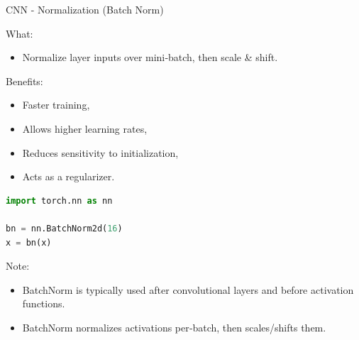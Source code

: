 \begin{frame}[fragile]{CNN - Normalization (Batch Norm)}
\begin{block}{What:}
    \begin{itemize}
        \item Normalize layer inputs over mini‑batch, then scale & shift.
    \end{itemize}
\end{block}

\begin{block}{Benefits:}
    \begin{itemize}
        \item Faster training,
        \item Allows higher learning rates,
        \item Reduces sensitivity to initialization,
        \item Acts as a regularizer.
    \end{itemize}
\end{block}

\begin{lstlisting}[language=Python, caption={Code snippet (PyTorch)}, basicstyle=\ttfamily\footnotesize]
import torch.nn as nn

bn = nn.BatchNorm2d(16)
x = bn(x)
\end{lstlisting}

\begin{block}{Note:}
    \begin{itemize}
        \item BatchNorm is typically used after convolutional layers and before activation functions.
        \item BatchNorm normalizes activations per‑batch, then scales/shifts them. 
    \end{itemize}
\end{block}
\end{frame}  

